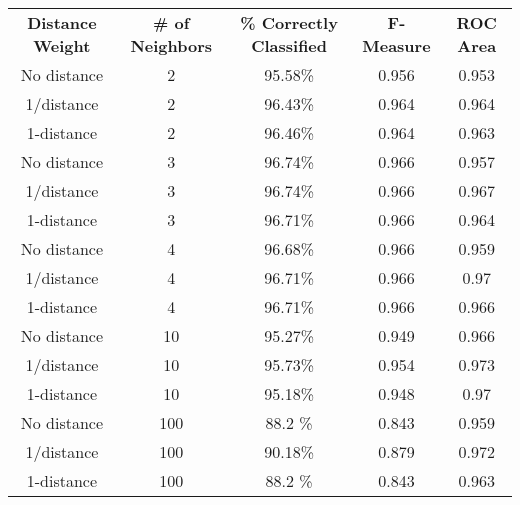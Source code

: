 \documentclass{article}
\begin{document}
\begin{center}
\begin{tabular}{c | c | c | c | c}
\textbf{Distance Weight} & \textbf{\# of Neighbors} & \textbf{\% Correctly Classified} & \textbf{F-Measure} & \textbf{ROC Area}\\
No distance & 2   & 95.58\% & 0.956 & 0.953\\
1/distance  & 2   & 96.43\% & 0.964 & 0.964\\
1-distance  & 2   & 96.46\% & 0.964 & 0.963\\
No distance & 3   & 96.74\% & 0.966 & 0.957\\
1/distance  & 3   & 96.74\% & 0.966 & 0.967\\
1-distance  & 3   & 96.71\% & 0.966 & 0.964\\
No distance & 4   & 96.68\% & 0.966 & 0.959\\
1/distance  & 4   & 96.71\% & 0.966 & 0.97\\
1-distance  & 4   & 96.71\% & 0.966 & 0.966\\
No distance & 10  & 95.27\% & 0.949 & 0.966\\
1/distance  & 10  & 95.73\% & 0.954 & 0.973\\
1-distance  & 10  & 95.18\% & 0.948 & 0.97\\
No distance & 100 & 88.2 \% & 0.843 & 0.959\\
1/distance  & 100 & 90.18\% & 0.879 & 0.972\\
1-distance  & 100 & 88.2 \% & 0.843 & 0.963\\
\end{tabular}
\end{center}
\end{document}
